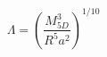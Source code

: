 \begin{equation}
\Lambda = \left(\frac{M_{5D}^{3}}{R^{5} a^{2}}\right)^{1/10}\label{Lmin}
\end{equation}

